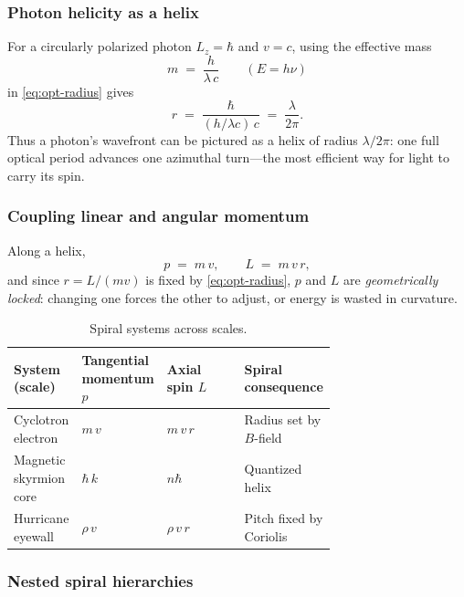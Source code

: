 \subsubsection*{Photon helicity as a helix}

For a circularly polarized photon \(L_z=\hbar\) and \(v=c\), using the effective mass
\[
  m \;=\; \frac{h}{\lambda\,c}
  \qquad (E = h\nu)
\]
in \eqref{eq:opt-radius} gives
\[
  r \;=\; \frac{\hbar}{(h/\lambda c)\,c}
     \;=\; \frac{\lambda}{2\pi}.
\]
Thus a photon’s wavefront can be pictured as a helix of radius \(\lambda/2\pi\): one full optical period advances one azimuthal turn—the most efficient way for light to carry its spin.

\subsubsection*{Coupling linear and angular momentum}

Along a helix,
\[
  p \;=\; m\,v,
  \qquad
  L \;=\; m\,v\,r,
\]
and since \(r=L/(mv)\) is fixed by \eqref{eq:opt-radius}, \(p\) and \(L\) are \emph{geometrically locked}: changing one forces the other to adjust, or energy is wasted in curvature.

\begin{table}[H]
  \small
  \centering
  \caption{Spiral systems across scales.}
  \label{tab:spiral-systems}
  \renewcommand{\arraystretch}{1.15}
  \begin{tabularx}{\linewidth}{@{}p{0.20\linewidth} p{0.25\linewidth} p{0.25\linewidth} X@{}}
    \toprule
    \textbf{System (scale)} & \textbf{Tangential momentum \(p\)} & \textbf{Axial spin \(L\)} & \textbf{Spiral consequence} \\
    \midrule
    Cyclotron electron     & \(m\,v\)                     & \(m\,v\,r\)           & Radius set by \(B\)-field \\
    Magnetic skyrmion core & \(\hbar\,k\)                 & \(n\hbar\)            & Quantized helix \\
    Hurricane eyewall      & \(\rho\,v\)                  & \(\rho\,v\,r\)        & Pitch fixed by Coriolis \\
    \bottomrule
  \end{tabularx}
\end{table}

\subsubsection*{Nested spiral hierarchies}

